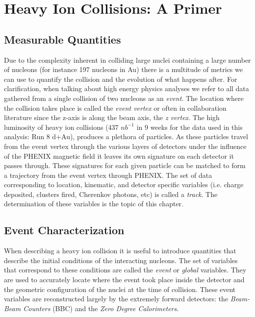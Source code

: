 \chapter{Heavy Ion Collisions: A Primer} %
\label{hicollisions}
\section{Measurable Quantities}
Due to the complexity inherent in colliding large nuclei containing a large number of nucleons (for instance 197 nucleons in Au) there is a multitude of metrics we can use to quantify the collision and the evolution of what happens after. For clarification, when talking about high energy physics analyses we refer to all data gathered from a single collision of two nucleons as an \textit{event}. The location where the collision takes place is called the \textit{event vertex} or often in collaboration literature since the z-axis is along the beam axis, the \textit{z vertex}. The high luminosity of heavy ion collisions (437 $nb^{-1}$ in 9 weeks for the data used in this analysis: Run 8 d+Au), produces a plethora of particles. As these particles travel from the event vertex through the various layers of detectors under the influence of the PHENIX magnetic field it leaves its own signature on each detector it passes through. These signatures for each given particle can be matched to form a trajectory from the event vertex through PHENIX. The set of data corresponding to location, kinematic, and detector specific variables (i.e. charge deposited, clusters fired, Cherenkov photons, etc) is called a \textit{track}. The determination of these variables is the topic of this chapter.

\section{Event Characterization}
When describing a heavy ion collision it is useful to introduce quantities that describe the initial conditions of the interacting nucleons. The set of variables that correspond to these conditions are called the \textit{event} or \textit{global} variables. They are used to accurately locate where the event took place inside the detector and the geometric configuration of the nuclei at the time of collision. These event variables are reconstructed largely by the extremely forward detectors: the \textit{Beam-Beam Counters} (BBC) and the \textit{Zero Degree Calorimeters}. 

